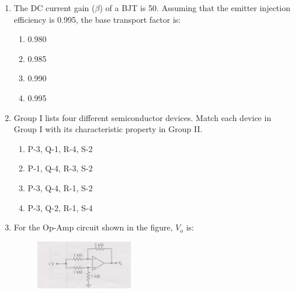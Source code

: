 \documentclass[journal,12pt,onecolumn]{IEEEtran}
\theoremstyle{remark}
\begin{document}
\begin{enumerate}
\item The DC current gain ($\beta$) of a BJT is 50. Assuming that the emitter injection efficiency is 0.995, the base transport factor is:
\hfill{}

\begin{multicols}{4}
\begin{enumerate}
  \item 0.980
  \item 0.985
  \item 0.990
  \item 0.995
\end{enumerate}
\end{multicols}

\item Group I lists four different semiconductor devices. Match each device in Group I with its characteristic property in Group II. 

\hfill{}

\begin{enumerate}
    \item P-3, Q-1, R-4, S-2
    \item P-1, Q-4, R-3, S-2
    \item P-3, Q-4, R-1, S-2
    \item P-3, Q-2, R-1, S-4
\end{enumerate}

\item For the Op-Amp circuit shown in the figure, $V_o$ is: 

\begin{figure}[ht!]
    \centering
    \includegraphics[width=0.4\textwidth]{Q36.png}
    \caption{}
    \label{fig:Q36.png}
\end{figure}


\end{enumerate}
\end{document}
